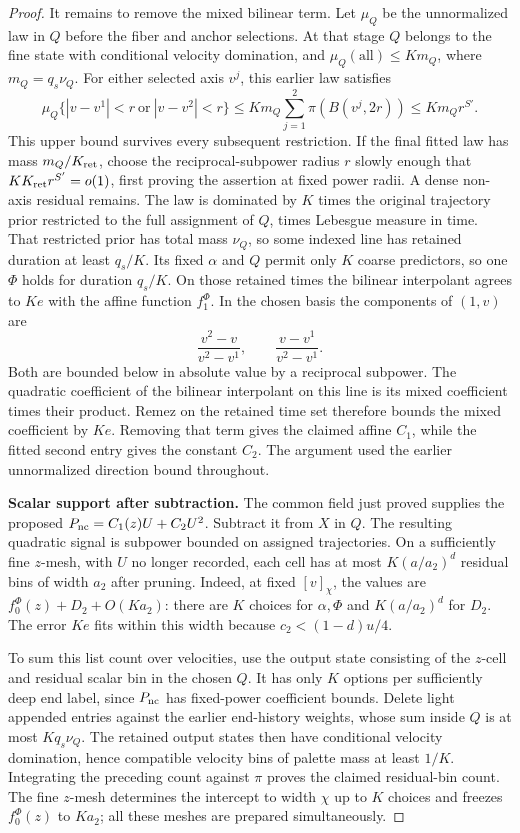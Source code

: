 \begin{proof}
It remains to remove the mixed bilinear term. Let \(\mu_Q\) be
the unnormalized law in \(Q\) before the fiber and anchor
selections. At that stage \(Q\) belongs to the fine state with
conditional velocity domination, and \(\mu_Q(\mathrm{all})\le
Km_Q\), where \(m_Q=q_s\nu_Q\). For either selected axis
\(v^j\), this earlier law satisfies
\[
 \mu_Q\{|v-v^1|<r\ \text{or}\ |v-v^2|<r\}
 \leq K m_Q\sum_{j=1}^2\pi(B(v^j,2r))
 \leq K m_Q r^{S'}.
\]
This upper bound survives every subsequent restriction.  If
the final fitted law has mass \(m_Q/K_{\rm ret}\), choose the
reciprocal-subpower radius \(r\) slowly enough that
\(K K_{\rm ret}r^{S'}=o(1)\), first proving the assertion at
fixed power radii.  A dense non-axis residual remains.
The law is dominated by \(K\) times the original trajectory prior
restricted to the full assignment of \(Q\), times Lebesgue measure
in time.  That restricted prior has total mass \(\nu_Q\), so
some indexed line has retained duration at least \(q_s/K\).
Its fixed \(\alpha\) and \(Q\) permit only \(K\) coarse
predictors, so one \(\Phi\) holds for duration \(q_s/K\).
On those retained times the bilinear interpolant agrees to
\(Ke\) with the affine function \(f_1^\Phi\).
In the chosen basis the components of \((1,v)\) are
\[
 \frac{v^2-v}{v^2-v^1},\qquad
 \frac{v-v^1}{v^2-v^1}.
\]
Both are bounded below in absolute value by a reciprocal
subpower.  The quadratic coefficient of the bilinear
interpolant on this line is its mixed coefficient times their
product.  Remez on the retained time set therefore bounds
the mixed coefficient by \(Ke\). Removing that term gives the
claimed affine \(C_1\), while the fitted second entry gives the
constant \(C_2\). The argument used the earlier unnormalized
direction bound throughout.


\par\smallskip\noindent\textbf{Scalar support after subtraction.}\quad
The common field just proved supplies the proposed
\(P_{\rm nc}=C_1(z)U+C_2U^2\). Subtract it from \(X\) in \(Q\).
The resulting quadratic signal is subpower bounded on assigned
trajectories. On a sufficiently fine \(z\)-mesh, with \(U\) no
longer recorded, each cell has at most \(K(a/a_2)^d\) residual
bins of width \(a_2\) after pruning. Indeed, at fixed
\([v]_\chi\), the values are
\(f_0^\Phi(z)+D_2+O(Ka_2)\): there are \(K\) choices for
\(\alpha,\Phi\) and \(K(a/a_2)^d\) for \(D_2\). The error
\(Ke\) fits within this width because \(c_2<(1-d)u/4\).

To sum this list count over velocities, use the output state
consisting of the \(z\)-cell and residual scalar bin in the chosen
\(Q\). It has only \(K\) options per sufficiently deep end label,
since \(P_{\rm nc}\) has fixed-power coefficient bounds. Delete
light appended entries against the earlier end-history weights,
whose sum inside \(Q\) is at most \(Kq_s\nu_Q\). The retained
output states then have conditional velocity domination, hence
compatible velocity bins of palette mass at least \(1/K\).
Integrating the preceding count against \(\pi\) proves the
claimed residual-bin count. The fine \(z\)-mesh determines the
intercept to width \(\chi\) up to \(K\) choices and freezes
\(f_0^\Phi(z)\) to \(Ka_2\); all these meshes are prepared
simultaneously.


\end{proof}

